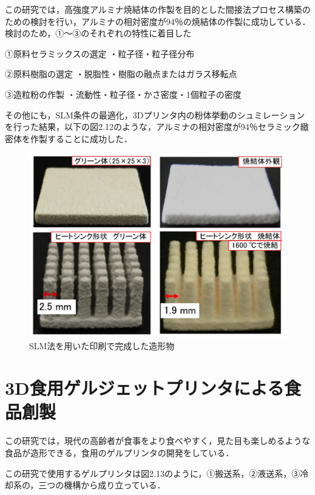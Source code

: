 この研究では，高強度アルミナ焼結体の作製を目的とした間接法プロセス構築のための検討を行い，アルミナの相対密度が94％の焼結体の作製に成功している．
検討のため，①～③のそれぞれの特性に着目した

①原料セラミックスの選定
・粒子径・粒子径分布

②原料樹脂の選定
・脱脂性・樹脂の融点またはガラス移転点

③造粒粉の作製
・流動性・粒子径・かさ密度・1個粒子の密度

その他にも，SLM条件の最適化，3Dプリンタ内の粉体挙動のシュミレーションを行った結果，以下の図2.12のような，アルミナの相対密度が94％セラミック緻密体を作製することに成功した．

\begin{figure}[H]
  \centering
  \includegraphics[width=11truecm]{./fig/seramikku.jpg}
  \caption{SLM法を用いた印刷で完成した造形物}
  \label{fig:ferret}
\end{figure}


\section{3D食用ゲルジェットプリンタによる食品創製\cite{i}}
\label{sec:enum}
この研究では，現代の高齢者が食事をより食べやすく，見た目も楽しめるような食品が造形できる，食用のゲルプリンタの開発をしている．

この研究で使用するゲルプリンタは図2.13のように，①搬送系，②液送系，③冷却系の，三つの機構から成り立っている．

